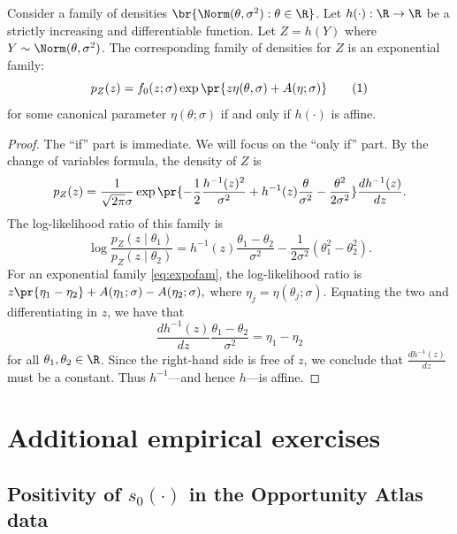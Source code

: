 \documentclass[12pt, reqno]{amsart}
\newcommand\numberthis{\addtocounter{equation}{1}\tag{\theequation}}
\numberwithin{equation}{section}
\begin{document}
\begin{refsection}
\begin{appendices}
\begin{lemma} 
\label{lemma:transform2}
Consider a family of densities $\br{\Norm
 (\theta, \sigma^2): \theta \in \R}$. Let $h(\cdot): \R \to \R$ be a strictly increasing
 and
 differentiable function. Let $Z = h(Y)$ where $Y
\sim \Norm
(\theta, \sigma^2)$. The corresponding family of densities for $Z$ is an exponential
family: \[
p_Z(z) = f_0(z; \sigma) \exp\pr{
  z\eta(\theta, \sigma) + A(\eta; \sigma)
} \numberthis \label{eq:expofam}
\]
for some canonical parameter $\eta(\theta; \sigma)$
if and only if $h(\cdot)$ is affine. 
\end{lemma}

\begin{proof}
The ``if'' part is immediate. We will focus on the ``only if'' part. By the change of
variables formula, the density of $Z$ is \[
p_Z(z) = \frac{1}{\sqrt{2\pi} \sigma}\exp\pr{
  -\frac{1}{2} \frac{h^{-1}(z)^2}{\sigma^2} + h^{-1}(z) \frac{\theta}{\sigma^2} - 
  \frac{\theta^2}
  {2 \sigma^2}
} \frac{dh^{-1}(z)}{dz}.
\]
The log-likelihood ratio of this family is \[
\log \frac{p_Z(z \mid \theta_1)}{p_Z(z \mid \theta_2)} = {
  h^{-1}(z) \frac{\theta_1 - \theta_2}{\sigma^2} - \frac{1}{2\sigma^2} (\theta_1^2 -
  \theta_2^2)
}.
\]
For an exponential family \eqref{eq:expofam}, the log-likelihood ratio is $
z \pr{\eta_1 - \eta_2} + A(\eta_1; \sigma) - A
(\eta_2;\sigma),
$
where $\eta_j = \eta(\theta_j; \sigma)$. Equating the two and differentiating in $z$, we
have that \[
\frac{dh^{-1}(z)}{dz} \frac{\theta_1 - \theta_2}{\sigma^2} = \eta_1 - \eta_2
\]
for all $\theta_1, \theta_2 \in \R$. Since the right-hand side is free of $z$, we conclude
that $\frac{dh^{-1}(z)}{dz}$ must be a constant. Thus $h^{-1}$---and hence $h$---is
affine.
\end{proof}













\section{Additional empirical exercises}

\subsection{Positivity of $s_0(\cdot)$ in the Opportunity Atlas data}
\label{asub:variance_right_tail}



\end{appendices}
\end{refsection}
\end{document}
